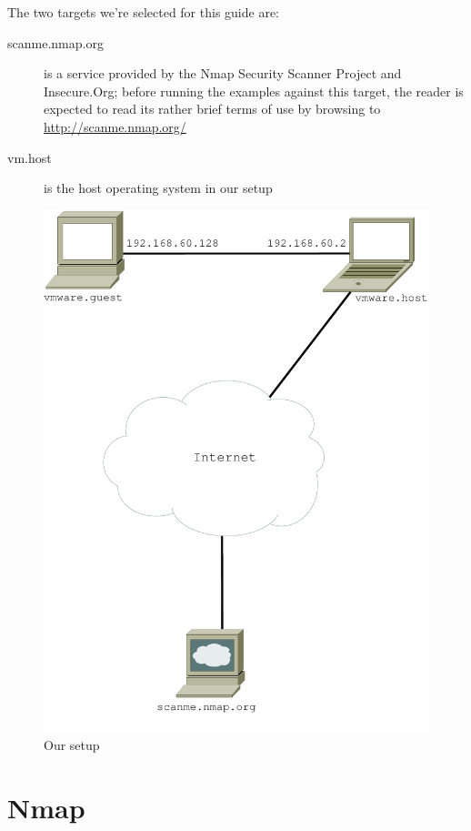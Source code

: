 \documentclass[a4paper,oneside,12pt]{book}
\begin{document}
The two targets we're selected for this guide are:
\begin{description}
\item[scanme.nmap.org] is a service provided by the Nmap Security Scanner Project and Insecure.Org; before running the examples against this target, the reader is expected to read its rather brief terms of use by browsing to \url{http://scanme.nmap.org/}
\item[vm.host] is the host operating system in our setup
\end{description}

\begin{figure}[ht]
	\centering
	\includegraphics[scale=0.6]{setup}
	\caption{Our setup}
	\label{fig:network_setup}	
\end{figure}

\section{Nmap}
\end{document}
